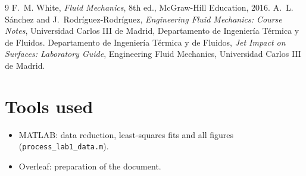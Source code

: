 \documentclass[11pt,a4paper]{article}
\numberwithin{equation}{section}
\begin{document}
\begin{thebibliography}{9}
 F.~M. White, \textit{Fluid Mechanics}, 8th ed., McGraw-Hill Education, 2016.
 A.~L. S\'anchez and J.~Rodr\'iguez-Rodr\'iguez, \textit{Engineering Fluid Mechanics: Course Notes}, Universidad Carlos III de Madrid, Departamento de Ingenier\'ia T\'ermica y de Fluidos.
 Departamento de Ingenier\'ia T\'ermica y de Fluidos, \textit{Jet Impact on Surfaces: Laboratory Guide}, Engineering Fluid Mechanics, Universidad Carlos III de Madrid.
\end{thebibliography}

\section*{Tools used}
\begin{itemize}[leftmargin=1.5em, itemsep=0.2em]
  \item MATLAB: data reduction, least-squares fits and all figures (\texttt{process\_\allowbreak lab1\_\allowbreak data.m}).
  \item Overleaf: preparation of the document.
\end{itemize}
\end{document}
